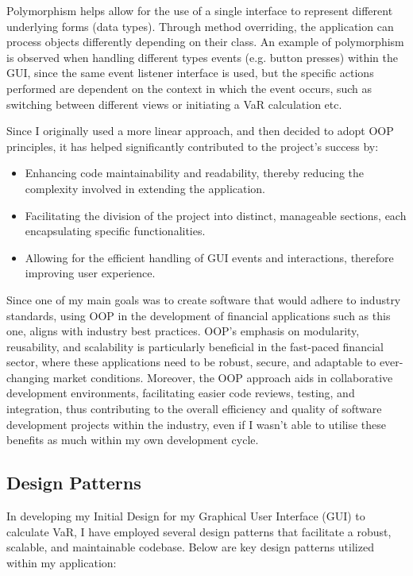\documentclass{article}
\begin{document}
Polymorphism helps allow for the use of a single interface to represent different underlying forms (data types). Through method overriding, the application can process objects differently depending on their class. An example of polymorphism is observed when handling different types events (e.g. button presses) within the GUI, since the same event listener interface is used, but the specific actions performed are dependent on the context in which the event occurs, such as switching between different views or initiating a VaR calculation etc.\\\vspace{0.3cm}

Since I originally used a more linear approach, and then decided to adopt OOP principles, it has helped significantly contributed to the project's success by:
\begin{itemize}
    \item Enhancing code maintainability and readability, thereby reducing the complexity involved in extending the application.
    \item Facilitating the division of the project into distinct, manageable sections, each encapsulating specific functionalities.
    \item Allowing for the efficient handling of GUI events and interactions, therefore improving user experience.
\end{itemize}

Since one of my main goals was to create software that would adhere to industry standards, using OOP in the development of financial applications such as this one, aligns with industry best practices. OOP's emphasis on modularity, reusability, and scalability is particularly beneficial in the fast-paced financial sector, where these applications need to be robust, secure, and adaptable to ever-changing market conditions. Moreover, the OOP approach aids in collaborative development environments, facilitating easier code reviews, testing, and integration, thus contributing to the overall efficiency and quality of software development projects within the industry, even if I wasn't able to utilise these benefits as much within my own development cycle.


\subsection{Design Patterns}

In developing my Initial Design for my Graphical User Interface (GUI) to calculate VaR, I have employed several design patterns that facilitate a robust, scalable, and maintainable codebase. Below are key design patterns utilized within my application:\\\vspace{0.3cm}
\end{document}
